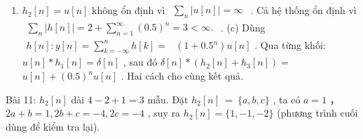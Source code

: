 \documentclass[
  10
]{article}
\providecommand{\tightlist}{%
  \setlength{\itemsep}{0pt}\setlength{\parskip}{0pt}}
\begin{document}
\begin{enumerate}
\def\labelenumi{(\alph{enumi})}
\setcounter{enumi}{1}
\tightlist
\item
  \(h _ { 2 } [ n ] = u [ n ]\) không ổn định vì
  \(\begin{array} { r } { \sum _ { n } | u [ n ] | = \infty } \end{array}\)
  . Cả hệ thống ổn định vì
  \(\begin{array} { r } { \sum _ { n } \left| h [ n ] \right| = 2 + \sum _ { n = 1 } ^ { \infty } ( 0 . 5 ) ^ { n } = 3 < \infty . } \end{array}\)
  . (c) Dùng
  \(\begin{array} { r } { h [ n ] \colon y [ n ] = \sum _ { k = - \infty } ^ { n } h [ k ] = } \end{array}\)
  \(( 1 + 0 . 5 ^ { n } ) u [ n ]\) . Qua từng khối:
  \(u [ n ] * h _ { 1 } [ n ] = \delta [ n ]\) , sau đó
  \(\delta [ n ] * \left( h _ { 2 } [ n ] + h _ { 3 } [ n ] \right) =\)
  \(u [ n ] + ( 0 . 5 ) ^ { n } u [ n ]\) . Hai cách cho cùng kết quả.
\end{enumerate}

Bài 11: \(h _ { 2 } [ n ]\) dài \(4 - 2 + 1 = 3\) mẫu. Đặt
\(h _ { 2 } [ n ] \ = \ \{ a , b , c \}\) , ta có \(a = 1\) ，
\(2 a + b = 1 , 2 b + c = - 4 , 2 c = - 4\) , suy ra
\(h _ { 2 } [ n ] = \{ { 1 , - 1 , - 2 } \}\) (phương trình cuối dùng để
kiểm tra lại).
\end{document}
